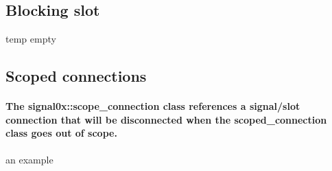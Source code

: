 \documentclass[9pt,onside,a4paper]{article}
\begin{document}
\subsection{Blocking slot}
temp empty
   
\subsection{Scoped connections}
\paragraph{The signal0x::scope\_connection class references a signal/slot connection that will be disconnected when the scoped\_connection class goes out of scope. \\}

an example \\
\end{document}
